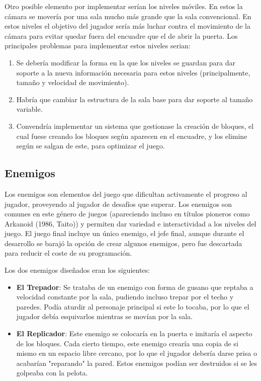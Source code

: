 Otro posible elemento por implementar serían los niveles móviles. En estos la cámara se movería por una sala mucho más grande que la sala convencional. En estos niveles el objetivo del jugador sería más luchar contra el movimiento de la cámara para evitar quedar fuera del encuadre que el de abrir la puerta. Los principales problemas para implementar estos niveles serian:
\begin{enumerate}
\item Se debería modificar la forma en la que los niveles se guardan para dar soporte a la nueva información necesaria para estos niveles (principalmente, tamaño y velocidad de movimiento).  
\item Habría que cambiar la estructura de la sala base para dar soporte al tamaño variable.
\item Convendría implementar un sistema que gestionase la creación de bloques, el cual fuese creando los bloques según aparecen en el encuadre, y los elimine según se salgan de este, para optimizar el juego.
\end{enumerate}

\subsection{Enemigos}
Los enemigos son elementos del juego que dificultan activamente el progreso al jugador, proveyendo al jugador de desafíos que superar\cite{game_design_patters}. Los enemigos son comunes en este género de juegos (apareciendo incluso en títulos pioneros como Arkanoid (1986, Taito)) y permiten dar variedad e interactividad a los niveles del juego. El juego final incluye un único enemigo, el jefe final, aunque durante el desarrollo se barajó la opción de crear algunos enemigos, pero fue descartada para reducir el coste de su programación.

Los dos enemigos diseñados eran los siguientes:
\begin{itemize}
\item \textbf{El Trepador}: Se trataba de un enemigo con forma de gusano que reptaba a velocidad constante por la sala, pudiendo incluso trepar por el techo y paredes. Podía aturdir al personaje principal si este lo tocaba, por lo que el jugador debía esquivarlos mientras se movían por la sala.
\item \textbf{El Replicador}: Este enemigo se colocaría en la puerta e imitaría el aspecto de los bloques. Cada cierto tiempo, este enemigo crearía una copia de si mismo en un espacio libre cercano, por lo que el jugador debería darse prisa o acabarían "reparando" la pared. Estos enemigos podían ser destruidos si se les golpeaba con la pelota.
\end{itemize}

